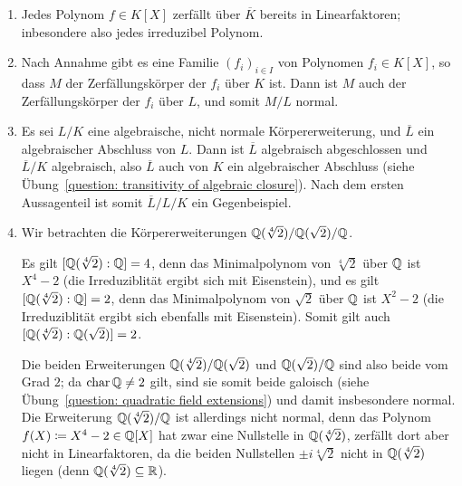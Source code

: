 \begin{solution}
  \begin{enumerate}
    \item
      Jedes Polynom $f \in K[X]$ zerfällt über $\overline{K}$ bereits in Linearfaktoren;
      inbesondere also jedes irreduzibel Polynom.
      
    \item
      Nach Annahme gibt es eine Familie $(f_i)_{i \in I}$ von Polynomen $f_i \in K[X]$, so dass $M$ der Zerfällungskörper der $f_i$ über $K$ ist.
      Dann ist $M$ auch der Zerfällungskörper der $f_i$ über $L$, und somit $M/L$ normal.
      
    \item
      Es sei $L/K$ eine algebraische, nicht normale Körpererweiterung, und $\overline{L}$ ein algebraischer Abschluss von $L$.
      Dann ist $\overline{L}$ algebraisch abgeschlossen und $\overline{L}/K$ algebraisch, also $\overline{L}$ auch von $K$ ein algebraischer Abschluss (siehe Übung~\ref{question: transitivity of algebraic closure}).
      Nach dem ersten Aussagenteil ist somit $\overline{L}/L/K$ ein Gegenbeispiel.
      
    \item
      Wir betrachten die Körpererweiterungen $\mathbb{Q}(\sqrt[4]{2}) / \mathbb{Q}(\sqrt{2}) / \mathbb{Q}$.
      
      Es gilt $[\mathbb{Q}(\sqrt[4]{2}) : \mathbb{Q}] = 4$, denn das Minimalpolynom von $\sqrt[4]{2}$ über $\mathbb{Q}$ ist $X^4 - 2$ (die Irreduziblität ergibt sich mit Eisenstein), und es gilt $[\mathbb{Q}(\sqrt[4]{2}) : \mathbb{Q}] = 2$, denn das Minimalpolynom von $\sqrt{2}$ über $\mathbb{Q}$ ist $X^2 - 2$ (die Irreduziblität ergibt sich ebenfalls mit Eisenstein).
      Somit gilt auch $[\mathbb{Q}(\sqrt[4]{2}) : \mathbb{Q}(\sqrt{2})] = 2$.
      
      Die beiden Erweiterungen $\mathbb{Q}(\sqrt[4]{2}) / \mathbb{Q}(\sqrt{2})$ und $\mathbb{Q}(\sqrt{2}) / \mathbb{Q}$ sind also beide vom Grad $2$;
      da $\operatorname{char} \mathbb{Q} \neq 2$ gilt, sind sie somit beide galoisch (siehe Übung~\ref{question: quadratic field extensions}) und damit insbesondere normal.
      Die Erweiterung $\mathbb{Q}(\sqrt[4]{2}) / \mathbb{Q}$ ist allerdings nicht normal, denn das Polynom $f(X) \coloneqq X^4 - 2 \in \mathbb{Q}[X]$ hat zwar eine Nullstelle in $\mathbb{Q}(\sqrt[4]{2})$, zerfällt dort aber nicht in Linearfaktoren, da die beiden Nullstellen $\pm i \sqrt[4]{2}$ nicht in $\mathbb{Q}(\sqrt[4]{2})$ liegen (denn $\mathbb{Q}(\sqrt[4]{2}) \subseteq \mathbb{R}$).
  \end{enumerate}
\end{solution}


